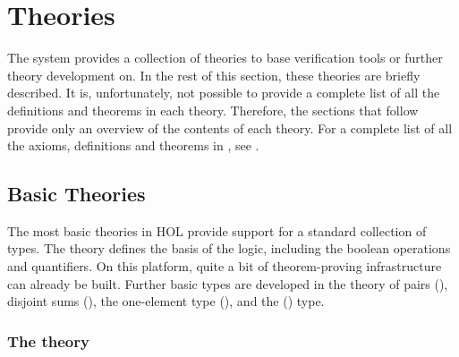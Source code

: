 \chapter{Theories}\label{HOLtheories}

\newcommand{\konst}[1]{\ensuremath{\mbox{\small{\textbf{\sf{#1}}}}}}
\newcommand{\nil}{\mathbf{[} \;\mathbf{]}}
\newcommand{\cons}[2]{{#1}\mathbf{:}\mathbf{:}{#2}}

 The \HOL{} system provides a collection of theories to base
verification tools or further theory development on.  In the rest of
this section, these theories are briefly described.  It is,
unfortunately, not possible to provide a complete list of all the
definitions and theorems in each theory. Therefore, the sections that
follow provide only an overview of the contents of each theory.  For a
complete list of all the axioms, definitions and theorems in \HOL, see
\REFERENCE.


\section{Basic Theories}

The most basic theories in HOL provide support for a standard
collection of types. The theory  defines the basis of
the \HOL{} logic, including the boolean operations and
quantifiers. On this platform, quite a bit of theorem-proving
infrastructure can already be built. Further basic types are developed
in the theory of pairs (), disjoint sums
(), the one-element type (), and the
() type.


\subsection{The theory }\label{boolfull}

